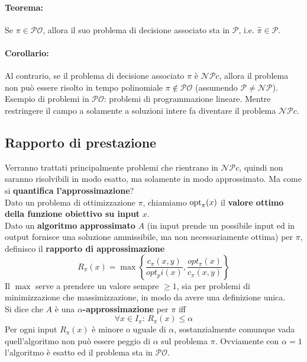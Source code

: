 \paragraph{Teorema:} Se $\pi \in \mathcal{PO}$, allora il suo problema di decisione associato sta in $\mathcal{P}$, i.e. $\hat{\pi} \in \mathcal{P}$.\\

\paragraph{Corollario:} Al contrario, se il problema di decisione associato $\hat{\pi}$ è $\mathcal{NP}c$, allora il problema non può essere risolto in tempo polinomiale $\pi \notin \mathcal{PO}$ (assumendo $\mathcal{P} \neq \mathcal{NP}$).\\

Esempio di problemi in $\mathcal{PO}$: problemi di programmazione lineare. Mentre restringere il campo a solamente a soluzioni intere fa diventare il problema $\mathcal{NP}c$.\\

\newpage

\subsection{Rapporto di prestazione} 

Verranno trattati principalmente problemi che rientrano in $\mathcal{NP}c$, quindi non saranno risolvibili in modo esatto, ma solamente in modo approssimato. Ma come si \textbf{quantifica l'approssimazione}? \\

Dato un problema di ottimizzazione $\pi$, chiamiamo $\operatorname*{opt}_\pi (x)$ il \textbf{valore ottimo della funzione obiettivo su input} $x$.\\
Dato un \textbf{algoritmo approssimato} $A$ (in input prende un possibile input ed in output fornisce una soluzione ammissibile, ma non necessariamente ottima) per $\pi$, definisco il \textbf{rapporto di approssimazione} 
$$ R_\pi (x) = \max \left\{\frac{c_\pi (x,y)}{opt_pi(x)}, \frac{opt_\pi (x)}{c_\pi (x,y)} \right\} $$
Il $\max$ serve a prendere un valore sempre $\geq 1$, sia per problemi di minimizzazione che massimizzazione, in modo da avere una definizione unica.\\

Si dice che $A$ è una \textbf{$\alpha$-approssimazione} per $\pi$ iff 
$$ \forall x \in I_\pi : \, R_\pi (x) \leq \alpha $$
Per ogni input $R_\pi (x)$ è minore o uguale di $\alpha$, sostanzialmente comunque vada quell'algoritmo non può essere peggio di $\alpha$ sul problema $\pi$. Ovviamente con $\alpha = 1$ l'algoritmo è esatto ed il problema sta in $\mathcal{PO}$.\\

